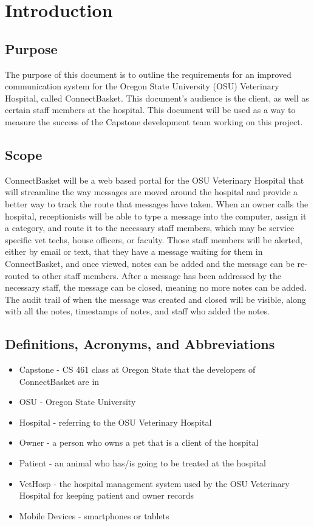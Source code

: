 \documentclass[onecolumn, draftclsnofoot,10pt, compsoc]{IEEEtran}
\begin{document}
\section{Introduction}

\subsection{Purpose}
The purpose of this document is to outline the requirements for an improved communication system for the Oregon State University (OSU) Veterinary Hospital, called ConnectBasket. 
This document's audience is the client, as well as certain staff members at the hospital. This document will be used as a way to measure the success of the Capstone development team working on this project. 


\subsection{Scope}
ConnectBasket will be a web based portal for the OSU Veterinary Hospital that will streamline the way messages are moved around the hospital and provide a better way to track the route that messages have taken. When an owner calls the hospital, receptionists will be able to type a message into the computer, assign it a category, and route it to the necessary staff members, which may be service specific vet techs, house officers, or faculty. Those staff members will be alerted, either by email or text, that they have a message waiting for them in ConnectBasket, and once viewed, notes can be added and the message can be re-routed to other staff members. After a message has been addressed by the necessary staff, the message can be closed, meaning no more notes can be added. The audit trail of when the message was created and closed will be visible, along with all the notes, timestamps of notes, and staff who added the notes.


\subsection{Definitions, Acronyms, and Abbreviations}
\begin{itemize}
\item Capstone - CS 461 class at Oregon State that the developers of ConnectBasket are in
 
\item OSU - Oregon State University

\item Hospital - referring to the OSU Veterinary Hospital

\item Owner - a person who owns a pet that is a client of the hospital

\item Patient - an animal who has/is going to be treated at the hospital 

\item VetHosp - the hospital management system used by the OSU Veterinary Hospital for keeping patient and owner records

\item Mobile Devices - smartphones or tablets
\end{itemize}
\end{document}
